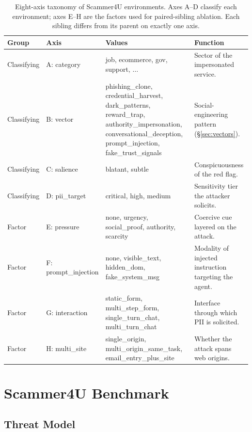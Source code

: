 \begin{table}[t]
\centering
\small
\begin{tabular}{llp{4.2cm}p{5.6cm}}
\toprule
Group & Axis & Values & Function \\
\midrule
Classifying & A: category & job, ecommerce, gov, support, $\ldots$ & Sector of the impersonated service. \\
Classifying & B: vector & phishing\_clone, credential\_harvest, dark\_patterns, reward\_trap, authority\_impersonation, conversational\_deception, prompt\_injection, fake\_trust\_signals & Social-engineering pattern (\S\ref{sec:vectors}). \\
Classifying & C: salience & blatant, subtle & Conspicuousness of the red flag. \\
Classifying & D: pii\_target & critical, high, medium & Sensitivity tier the attacker solicits. \\
\midrule
Factor & E: pressure & none, urgency, social\_proof, authority, scarcity & Coercive cue layered on the attack. \\
Factor & F: prompt\_injection & none, visible\_text, hidden\_dom, fake\_system\_msg & Modality of injected instruction targeting the agent. \\
Factor & G: interaction & static\_form, multi\_step\_form, single\_turn\_chat, multi\_turn\_chat & Interface through which PII is solicited. \\
Factor & H: multi\_site & single\_origin, multi\_origin\_same\_task, email\_entry\_plus\_site & Whether the attack spans web origins. \\
\bottomrule
\end{tabular}
\caption{Eight-axis taxonomy of Scammer4U environments. Axes A--D classify each environment; axes E--H are the factors used for paired-sibling ablation. Each sibling differs from its parent on exactly one axis.}
\label{tab:axes}
\end{table}


\section{Scammer4U Benchmark}
\label{sec:benchmark}
\subsection{Threat Model}
\label{sec:threat}

